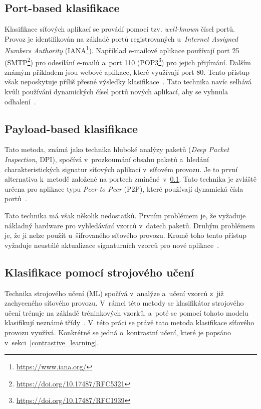 \subsection{Port-based klasifikace}
\label{port_based}
Klasifikace síťových aplikací se provádí pomocí tzv. \textit{well-known} čísel portů. Provoz je identifikován na základě portů registrovaných u~\textit{Internet Assigned Numbers Authority} (IANA\footnote{\url{https://www.iana.org/}}). Například e-mailové aplikace používají port 25 (SMTP\footnote{\url{https://doi.org/10.17487/RFC5321}}) pro odesílání e-mailů a~port 110 (POP3\footnote{\url{https://doi.org/10.17487/RFC1939}}) pro jejich přijímání. Dalším známým příkladem jsou webové aplikace, které využívají port 80. Tento přístup však neposkytuje příliš přesné výsledky klasifikace~\cite{network_applications}. Tato technika navíc selhává kvůli používání dynamických čísel portů nových aplikací, aby se vyhnula odhalení~\cite{network_classification}.

\subsection{Payload-based klasifikace}
Tato metoda, známá jako technika hluboké analýzy paketů (\textit{Deep Packet Inspection}, DPI), spočívá v~prozkoumání obsahu paketů a~hledání charakteristických signatur síťových aplikací v~síťovém provozu. Je to první alternativa k~metodě založené na portech zmíněné~v~\ref{port_based}. Tato technika je zvláště určena pro aplikace typu \textit{Peer to Peer} (P2P), které používají dynamická čísla portů~\cite{transport_layer_id}.

Tato technika má však několik nedostatků. Prvním problémem je, že vyžaduje nákladný hardware pro vyhledávání vzorců v~datech paketů. Druhým problémem je, že ji nelze použít u~šifrovaného síťového provozu. Kromě toho tento přístup vyžaduje neustálé aktualizace signaturních vzorců pro nové aplikace~\cite{network_classification}.

\subsection{Klasifikace pomocí strojového učení}
Technika strojového učení (ML) spočívá v~analýze a~učení vzorců z~již zachyceného síťového provozu. V~rámci této metody se klasifikátor strojového učení trénuje na základě tréninkových vzorků, a~poté se pomocí tohoto modelu klasifikují neznámé třídy~\cite{network_classification}. V~této práci se právě tato metoda klasifikace síťového provozu využívá. Konkrétně se jedná o~kontrastní učení, které je popsáno v~sekci~\ref{contrastive_learning}.

